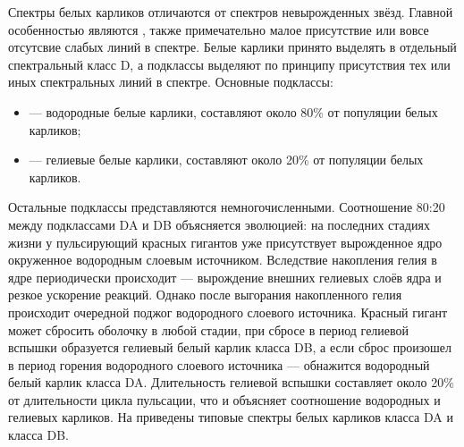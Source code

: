 Спектры белых карликов отличаются от спектров невырожденных звёзд. Главной особенностью являются , также примечательно малое присутствие или вовсе отсутсвие слабых линий в спектре. Белые карлики принято выделять в отдельный спектральный класс D, а подклассы выделяют по принципу присутствия тех или иных спектральных линий в спектре. Основные подклассы:
\begin{itemize}
	\item {} — водородные белые карлики, составляют около 80\% от популяции белых карликов;
	\item {} — гелиевые белые карлики, составляют около 20\% от популяции белых карликов.
\end{itemize}
Остальные подклассы представляются немногочисленными. Соотношение 80:20 между подклассами DA и DB объясняется эволюцией: на последних стадиях жизни у пульсирующий красных гигантов уже присутствует вырожденное ядро окруженное водородным слоевым источником. Вследствие накопления гелия в ядре периодически происходит  — вырождение внешних гелиевых слоёв ядра и резкое ускорение реакций. Однако после выгорания накопленного гелия происходит очередной поджог водородного слоевого источника. Красный гигант может сбросить оболочку в любой стадии, при сбросе в период гелиевой вспышки образуется гелиевый белый карлик класса DB, а если сброс произошел в период горения водородного слоевого источника — обнажится водородный белый карлик класса DA. Длительность гелиевой вспышки составляет около 20\% от длительности цикла пульсации, что и объясняет соотношение водородных и гелиевых карликов. На  приведены типовые спектры белых карликов класса DA и класса DB.



